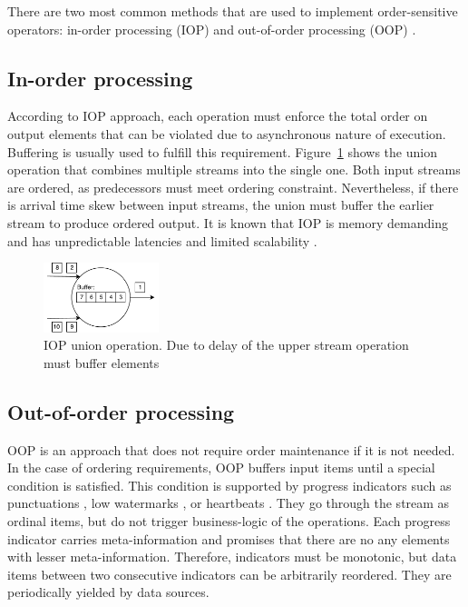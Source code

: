 
\label {fs-typical}

There are two most common methods that are used to implement order-sensitive operators: in-order processing (IOP) \cite{Arasu:2006:CCQ:1146461.1146463, Cranor:2003:GSD:872757.872838, hammad2004optimizing} and out-of-order processing (OOP) \cite{Li:2008:OPN:1453856.1453890}.

\subsection{In-order processing}
According to IOP approach, each operation must enforce the total order on output elements that can be violated due to asynchronous nature of execution. Buffering is usually used to fulfill this requirement. Figure~\ref{iop} shows the union operation that combines multiple streams into the single one. Both input streams are ordered, as predecessors must meet ordering constraint. Nevertheless, if there is arrival time skew between input streams, the union must buffer the earlier stream to produce ordered output. It is known that IOP is memory demanding and has unpredictable latencies and limited scalability \cite{Li:2008:OPN:1453856.1453890}.

\begin{figure}[htbp]
  \centering
  \includegraphics[width=0.30\textwidth]{pics/iop}
  \caption{IOP union operation. Due to delay of the upper stream operation must buffer elements}
  \label {iop}
\end{figure}

\subsection{Out-of-order processing}
OOP is an approach that does not require order maintenance if it is not needed. In the case of ordering requirements, OOP buffers input items until a special condition is satisfied. This condition is supported by progress indicators such as punctuations \cite{Tucker:2003:EPS:776752.776780}, low watermarks \cite{Akidau:2013:MFS:2536222.2536229}, or heartbeats \cite{Srivastava:2004:FTM:1055558.1055596}. They go through the stream as ordinal items, but do not trigger business-logic of the operations. Each progress indicator carries meta-information and promises that there are no any elements with lesser meta-information. Therefore, indicators must be monotonic, but data items between two consecutive indicators can be arbitrarily reordered. They are periodically yielded by data sources.

